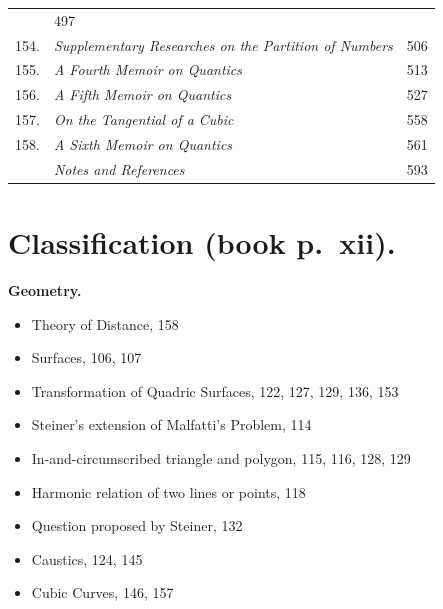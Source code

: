 \documentclass[11pt]{article}
\begin{document}
\begin{longtable}{@{}r p{} r@{}}
\hspace{1em}{\footnotesize Phil.\ Trans.\ t.\ cxlviii.\ (for 1858), pp.\ 39---46} & 497 \\
154. & \emph{Supplementary Researches on the Partition of Numbers} \dotfill \par
\hspace{1em}{\footnotesize Phil.\ Trans.\ t.\ cxlviii.\ (for 1858), pp.\ 47---52} & 506 \\
155. & \emph{A Fourth Memoir on Quantics} \dotfill \par
\hspace{1em}{\footnotesize Phil.\ Trans.\ t.\ cxlviii.\ (for 1858), pp.\ 415---427} & 513 \\
156. & \emph{A Fifth Memoir on Quantics} \dotfill \par
\hspace{1em}{\footnotesize Phil.\ Trans.\ t.\ cxlviii.\ (for 1858), pp.\ 429---460} & 527 \\
157. & \emph{On the Tangential of a Cubic} \dotfill \par
\hspace{1em}{\footnotesize Phil.\ Trans.\ t.\ cxlviii.\ (for 1858), pp.\ 461---463} & 558 \\
158. & \emph{A Sixth Memoir on Quantics} \dotfill \par
\hspace{1em}{\footnotesize Phil.\ Trans.\ t.\ cxlix.\ (for 1859), pp.\ 61---90} & 561 \\
 & \emph{Notes and References} \dotfill & 593 \\
\end{longtable}
\clearpage


\section*{Classification (book p.\ xii).}

\noindent\textbf{Geometry.}
\begin{itemize}\itemsep0pt
\item Theory of Distance, 158
\item Surfaces, 106, 107
\item Transformation of Quadric Surfaces, 122, 127, 129, 136, 153
\item Steiner's extension of Malfatti's Problem, 114
\item In-and-circumscribed triangle and polygon, 115, 116, 128, 129
\item Harmonic relation of two lines or points, 118
\item Question proposed by Steiner, 132
\item Caustics, 124, 145
\item Cubic Curves, 146, 157
\end{itemize}
\end{document}
